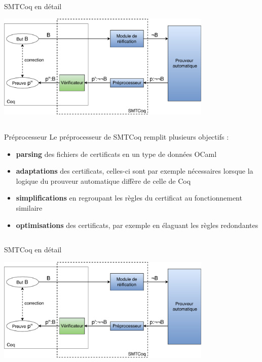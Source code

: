 \documentclass{beamer}
\begin{document}
    \subsection{}
    \begin{frame}{SMTCoq en détail}

      \begin{center}
        \includegraphics[height=5cm]{smt_auto.pdf}
      \end{center}


    \end{frame}

    \subsection{}
    \begin{frame}{Préprocesseur}
      Le préprocesseur de SMTCoq remplit plusieurs objectifs :
      \begin{itemize}
      \item \textbf{parsing} des fichiers de certificats en un type de données OCaml
      \item \textbf{adaptations} des certificats, celles-ci sont par exemple nécessaires lorsque la logique du prouveur automatique diffère de celle de Coq
      \item \textbf{simplifications} en regroupant les règles du certificat au fonctionnement similaire
      \item \textbf{optimisations} des certificats, par exemple en élaguant les règles redondantes
      \end{itemize}
    \end{frame}

    \subsection{}
    \begin{frame}{SMTCoq en détail}

      \begin{center}
        \includegraphics[height=5cm]{smt_auto.pdf}
      \end{center}


    \end{frame}
\end{document}
